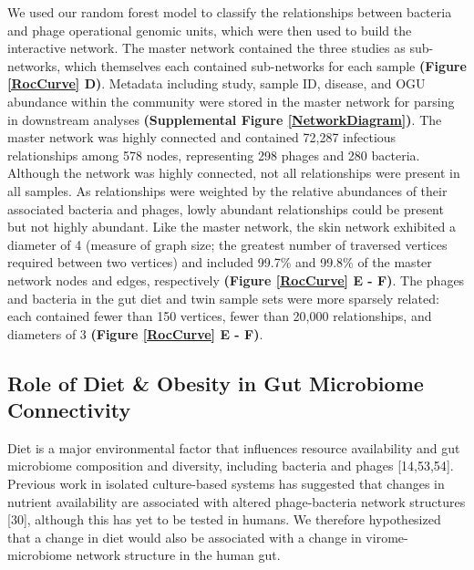 \documentclass[12pt,]{article}
\begin{document}
We used our random forest model to classify the relationships between
bacteria and phage operational genomic units, which were then used to
build the interactive network. The master network contained the three
studies as sub-networks, which themselves each contained sub-networks
for each sample \textbf{(Figure \ref{RocCurve} D)}. Metadata including
study, sample ID, disease, and OGU abundance within the community were
stored in the master network for parsing in downstream analyses
\textbf{(Supplemental Figure \ref{NetworkDiagram})}. The master network
was highly connected and contained 72,287 infectious relationships among
578 nodes, representing 298 phages and 280 bacteria. Although the
network was highly connected, not all relationships were present in all
samples. As relationships were weighted by the relative abundances of
their associated bacteria and phages, lowly abundant relationships could
be present but not highly abundant. Like the master network, the skin
network exhibited a diameter of 4 (measure of graph size; the greatest
number of traversed vertices required between two vertices) and included
99.7\% and 99.8\% of the master network nodes and edges, respectively
\textbf{(Figure \ref{RocCurve} E - F)}. The phages and bacteria in the
gut diet and twin sample sets were more sparsely related: each contained
fewer than 150 vertices, fewer than 20,000 relationships, and diameters
of 3 \textbf{(Figure \ref{RocCurve} E - F)}.

\subsection{Role of Diet \& Obesity in Gut Microbiome
Connectivity}\label{role-of-diet-obesity-in-gut-microbiome-connectivity}

Diet is a major environmental factor that influences resource
availability and gut microbiome composition and diversity, including
bacteria and phages {[}14,53,54{]}. Previous work in isolated
culture-based systems has suggested that changes in nutrient
availability are associated with altered phage-bacteria network
structures {[}30{]}, although this has yet to be tested in humans. We
therefore hypothesized that a change in diet would also be associated
with a change in virome-microbiome network structure in the human gut.
\end{document}
